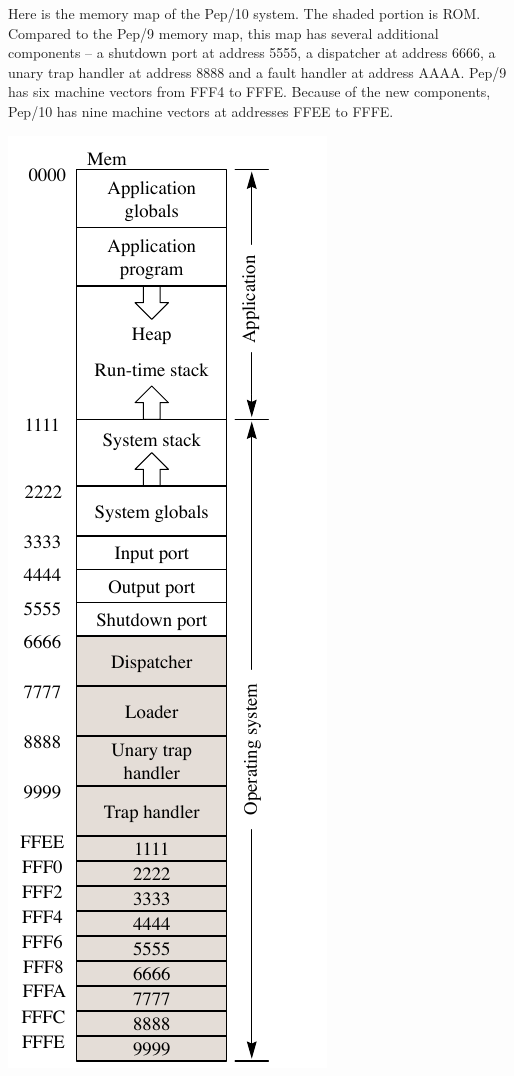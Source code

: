 \documentclass[10pt,fleqn]{book}
\begin{document}
\noindent Here is the memory map of the Pep/10 system.
The shaded portion is ROM.
Compared to the Pep/9 memory map, this map has several additional components -- a shutdown port at address 5555, a dispatcher at address 6666, a unary trap handler at address 8888 and a fault handler at address AAAA.
Pep/9 has six machine vectors from FFF4 to FFFE.
Because of the new components, Pep/10 has nine machine vectors at addresses FFEE to FFFE.\\
\begin{center}
\includegraphics{pep10-memory-map}
\end{center}
\end{document}
